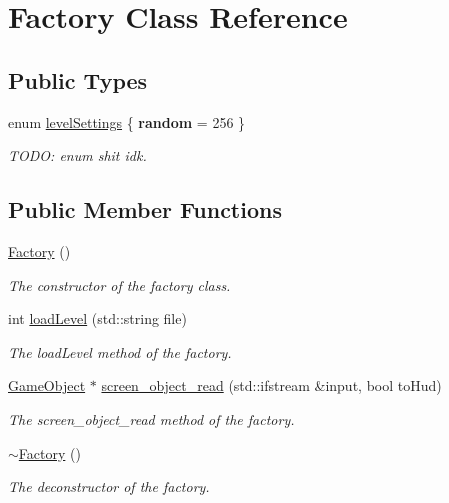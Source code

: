 \hypertarget{class_factory}{\section{Factory Class Reference}
\label{class_factory}
}
\subsection*{Public Types}
\begin{DoxyCompactItemize}
\item 
\hypertarget{class_factory_a31534970ff95c9cb57a4883cb8ef7b78}{enum \hyperlink{class_factory_a31534970ff95c9cb57a4883cb8ef7b78}{level\+Settings} \{ {\bfseries random} = 256
 \}}\label{class_factory_a31534970ff95c9cb57a4883cb8ef7b78}

\begin{DoxyCompactList}\small\item\em T\+O\+D\+O\+: enum shit idk. \end{DoxyCompactList}\end{DoxyCompactItemize}
\subsection*{Public Member Functions}
\begin{DoxyCompactItemize}
\item 
\hyperlink{class_factory_ac792bf88cfb7b6804b479529da5308cc}{Factory} ()
\begin{DoxyCompactList}\small\item\em The constructor of the factory class. \end{DoxyCompactList}\item 
int \hyperlink{class_factory_af0852710e037ab8ded28cc12ec1c099b}{load\+Level} (std\+::string file)
\begin{DoxyCompactList}\small\item\em The load\+Level method of the factory. \end{DoxyCompactList}\item 
\hyperlink{class_game_object}{Game\+Object} $\ast$ \hyperlink{class_factory_ad7696889634790fcac45cfd18ae44039}{screen\+\_\+object\+\_\+read} (std\+::ifstream \&input, bool to\+Hud)
\begin{DoxyCompactList}\small\item\em The screen\+\_\+object\+\_\+read method of the factory. \end{DoxyCompactList}\item 
\hyperlink{class_factory_a8f71456f48e4df402c778a44191ff40e}{$\sim$\+Factory} ()
\begin{DoxyCompactList}\small\item\em The deconstructor of the factory. \end{DoxyCompactList}\end{DoxyCompactItemize}


